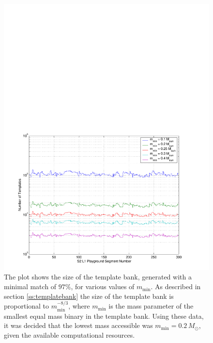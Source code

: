 \begin{figure}[p]
\begin{center}
\includegraphics[width=\linewidth]{figures/result/bank_size}
\end{center}
\caption[MACHO Template Bank Size for Various Lower Masses]{%
\label{f:bank_size}%
The plot shows the size of the template bank, generated with a minimal match
of $97\%$, for various values of $m_\mathrm{min}$. As described in section
\ref{ss:templatebank} the size of the template bank is proportional to
$m_\mathrm{min}^{-8/3}$, where $m_\mathrm{min}$ is the mass parameter of the
smallest equal mass binary in the template bank. Using these data, it was
decided that the lowest mass accessible was $m_\mathrm{min} = 0.2\,M_\odot$,
given the available computational resources.}
\end{figure}

